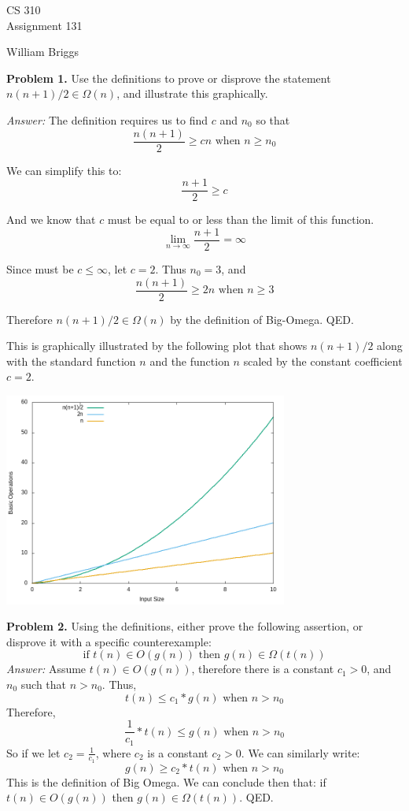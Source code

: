 \documentclass[11pt]{article}
\begin{document}
\thispagestyle{empty}

\begin{center}
{\large CS 310}\\
Assignment 131
\end{center}

\begin{flushright}
William Briggs
\end{flushright}

\textbf{Problem 1.} Use the definitions to prove or disprove the
statement $n(n + 1)/2 \in \Omega(n)$, and illustrate this graphically.

\textit{Answer:} The definition requires us to find $c$ and $n_0$ so that
\[
\frac{n(n + 1)}{2} \geq cn \text{ when } n \geq n_0
\]

We can simplify this to:
\[
\frac{n + 1}{2} \geq c
\]

And we know that $c$ must be equal to or less than the limit of this function.
\[
\lim_{n \to \infty}\frac{n + 1}{2} = \infty
\]

Since must be $c \leq \infty$, let $c = 2$. Thus $n_0 = 3$, and
\[
\frac{n(n + 1)}{2} \geq 2n \text{ when } n \geq 3
\]

Therefore $n(n + 1)/2 \in \Omega(n)$ by the definition of Big-Omega. QED.

This is graphically illustrated by the following plot that shows
$n(n + 1)/2$ along with the standard function $n$ and the function $n$ scaled by
the constant coefficient $c = 2$.

\begin{center}
\includegraphics[width=0.7\textwidth]{problem_1.png}
\end{center} 

\textbf{Problem 2.} Using the definitions, either prove the following
assertion, or disprove it with a specific counterexample:
\[
\text{if } t(n) \in O(g(n)) \text{ then } g(n) \in \Omega(t(n))
\]
\textit{Answer:} Assume $t(n) \in O(g(n))$, therefore there is a constant $c_1 > 0$, and $n_0$ such that $n > n_0$. Thus,
\[
t(n) \leq c_1 * g(n) \text{ when } n > n_0
\]
Therefore,
\[
\frac{1}{c_1} * t(n) \leq g(n) \text{ when } n > n_0
\]
So if we let $c_2 = \frac{1}{c_1}$, where $c_2$ is a constant $c_2 > 0$. We can similarly write:
\[
g(n) \geq c_2 * t(n) \text{ when } n > n_0
\]
This is the definition of Big Omega. We can conclude then that: if $t(n) \in O(g(n))$ then $g(n) \in \Omega(t(n))$. QED.
\end{document}
